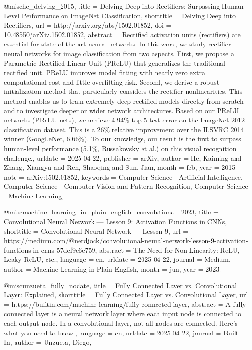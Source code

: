 @misc{he_delving_2015,
	title = {Delving {Deep} into {Rectifiers}: {Surpassing} {Human}-{Level} {Performance} on {ImageNet} {Classification}},
	shorttitle = {Delving {Deep} into {Rectifiers}},
	url = {http://arxiv.org/abs/1502.01852},
	doi = {10.48550/arXiv.1502.01852},
	abstract = {Rectified activation units (rectifiers) are essential for state-of-the-art neural networks. In this work, we study rectifier neural networks for image classification from two aspects. First, we propose a Parametric Rectified Linear Unit (PReLU) that generalizes the traditional rectified unit. PReLU improves model fitting with nearly zero extra computational cost and little overfitting risk. Second, we derive a robust initialization method that particularly considers the rectifier nonlinearities. This method enables us to train extremely deep rectified models directly from scratch and to investigate deeper or wider network architectures. Based on our PReLU networks (PReLU-nets), we achieve 4.94\% top-5 test error on the ImageNet 2012 classification dataset. This is a 26\% relative improvement over the ILSVRC 2014 winner (GoogLeNet, 6.66\%). To our knowledge, our result is the first to surpass human-level performance (5.1\%, Russakovsky et al.) on this visual recognition challenge.},
	urldate = {2025-04-22},
	publisher = {arXiv},
	author = {He, Kaiming and Zhang, Xiangyu and Ren, Shaoqing and Sun, Jian},
	month = feb,
	year = {2015},
	note = {arXiv:1502.01852},
	keywords = {Computer Science - Artificial Intelligence, Computer Science - Computer Vision and Pattern Recognition, Computer Science - Machine Learning},
}

@misc{machine_learning_in_plain_english_convolutional_2023,
	title = {Convolutional {Neural} {Network} — {Lesson} 9: {Activation} {Functions} in {CNNs}},
	shorttitle = {Convolutional {Neural} {Network} — {Lesson} 9},
	url = {https://medium.com/@nerdjock/convolutional-neural-network-lesson-9-activation-functions-in-cnns-57def9c6e759},
	abstract = {The Need for Non-Linearity: ReLU, Leaky ReLU, etc.},
	language = {en},
	urldate = {2025-04-22},
	journal = {Medium},
	author = {{Machine Learning in Plain English}},
	month = jun,
	year = {2023},
}

@misc{unzueta_fully_nodate,
	title = {Fully {Connected} {Layer} vs. {Convolutional} {Layer}: {Explained}},
	shorttitle = {Fully {Connected} {Layer} vs. {Convolutional} {Layer}},
	url = {https://builtin.com/machine-learning/fully-connected-layer},
	abstract = {A fully connected layer is a neural network layer where each input node is connected to each output node. In a convolutional layer, not all nodes are connected. Here’s what you need to know.},
	language = {en},
	urldate = {2025-04-22},
	journal = {Built In},
	author = {Unzueta, Diego},
}

